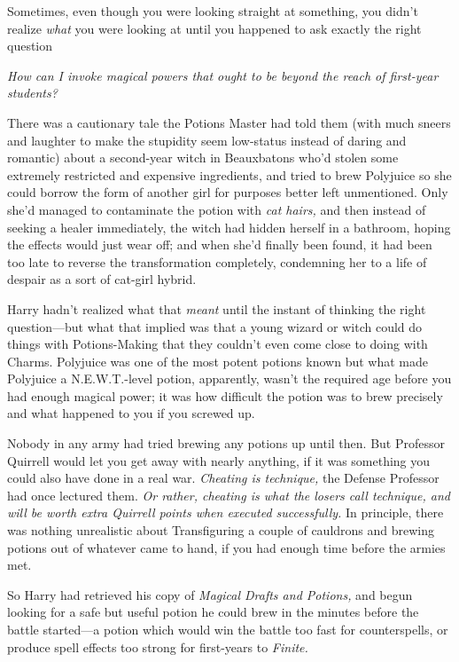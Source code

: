 Sometimes, even though you were looking straight at something, you didn't
realize \emph{what} you were looking at until you happened to ask exactly the
right question{\el}

\emph{How can I invoke magical powers that ought to be beyond the reach of
first-year students?}

There was a cautionary tale the Potions Master had told them (with much sneers
and laughter to make the stupidity seem low-status instead of daring and
romantic) about a second-year witch in Beauxbatons who'd stolen some extremely
restricted and expensive ingredients, and tried to brew Polyjuice so she could
borrow the form of another girl for purposes better left unmentioned. Only
she'd managed to contaminate the potion with \emph{cat hairs,} and then instead
of seeking a healer immediately, the witch had hidden herself in a bathroom,
hoping the effects would just wear off; and when she'd finally been found, it
had been too late to reverse the transformation completely, condemning her to a
life of despair as a sort of cat-girl hybrid.

Harry hadn't realized what that \emph{meant} until the instant of thinking the
right question---but what that implied was that a young wizard or witch could
do things with Potions-Making that they couldn't even come close to doing with
Charms. Polyjuice was one of the most potent potions known{\el} but what
made Polyjuice a N.E.W.T.-level potion, apparently, wasn't the required age
before you had enough magical power; it was how difficult the potion was to
brew precisely and what happened to you if you screwed up.

Nobody in any army had tried brewing any potions up until then. But Professor
Quirrell would let you get away with nearly anything, if it was something you
could also have done in a real war. \emph{Cheating is technique,} the Defense
Professor had once lectured them. \emph{Or rather, cheating is what the losers
call technique, and will be worth extra Quirrell points when executed
successfully.} In principle, there was nothing unrealistic about Transfiguring
a couple of cauldrons and brewing potions out of whatever came to hand, if you
had enough time before the armies met.

So Harry had retrieved his copy of \emph{Magical Drafts and Potions,} and begun
looking for a safe but useful potion he could brew in the minutes before the
battle started---a potion which would win the battle too fast for
counterspells, or produce spell effects too strong for first-years to
\emph{Finite.}

